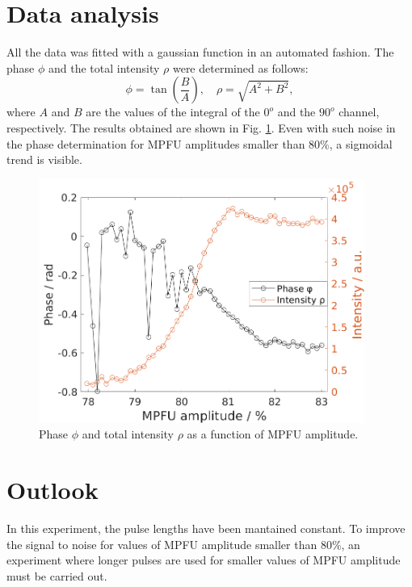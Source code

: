 \documentclass[a4paper, 11pt]{article}
\begin{document}
	\section*{Data analysis}
	All the data was fitted with a gaussian function in an automated fashion. The phase $\phi$ and the total intensity $\rho$ were determined as follows:
	\begin{equation}
		\phi = \tan{\left(\frac{B}{A}\right)},
		\quad
		\rho = \sqrt{A^2 + B^2},
	\end{equation}
	where $A$ and $B$ are the values of the integral of the $0^o$ and the $90^o$ channel, respectively. The results obtained are shown in Fig. \ref{fig:phaseAndIntensity_vs_mpfuAmp}. Even with such noise in the phase determination for MPFU amplitudes smaller than $80\%$, a sigmoidal trend is visible.
	\begin{figure}
		\centering
		\includegraphics[width=0.95\textwidth]{../../images/misc-E-001_phaseAndIntensity_vs_mpfuAmp}
		\caption{Phase $\phi$ and total intensity $\rho$ as a function of MPFU amplitude.}
		\label{fig:phaseAndIntensity_vs_mpfuAmp}
	\end{figure}
	
	\section*{Outlook}
	In this experiment, the pulse lengths have been mantained constant. To improve the signal to noise for values of MPFU amplitude smaller than $80\%$, an experiment where longer pulses are used for smaller values of MPFU amplitude must be carried out.
	
\end{document}
